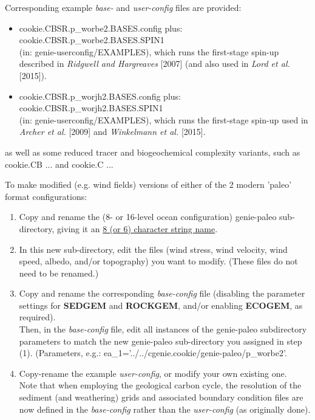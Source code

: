 \vspace{2mm}
\noindent Corresponding example \textit{base-} and \textit{user-config} files are provided:
\begin{itemize}[noitemsep]
\vspace{1mm}
\item \textsf{\footnotesize cookie.CBSR.p\_worbe2.BASES.config} plus: \textsf{\footnotesize cookie.CBSR.p\_worbe2.BASES.SPIN1} \\(in: \textsf{\footnotesize genie-userconfig/EXAMPLES}), which runs the first-stage spin-up described in \textit{Ridgwell and Hargreaves} [2007] (and also used in \textit{Lord et al.} [2015]).
\vspace{1mm}
\item \textsf{\footnotesize cookie.CBSR.p\_worjh2.BASES.config} plus: \textsf{\footnotesize cookie.CBSR.p\_worjh2.BASES.SPIN1} \\(in: \textsf{\footnotesize genie-userconfig/EXAMPLES}), which runs the first-stage spin-up used in \textit{Archer et al.} [2009] and \textit{Winkelmann et al.} [2015].
\end{itemize}

as well as some reduced tracer and biogeochemical complexity variants, such as \textsf{\footnotesize cookie.CB ...} and \textsf{\footnotesize cookie.C ...}

\vspace{2mm}
\noindent To make modified (e.g. wind fields) versions of either of the 2 modern 'paleo' format configurations:
\begin{enumerate}[noitemsep]
\vspace{1mm}
\item Copy and rename the  (8- or 16-level ocean configuration) \textsf{\footnotesize genie-paleo} sub-directory, giving it an \uline{8 (or 6) character string name}.
\vspace{1mm}
\item In this new sub-directory, edit the files (wind stress, wind velocity, wind speed, albedo, and/or topography) you want to modify. (These files do not need to be renamed.)
\vspace{1mm}
\item Copy and rename the corresponding \textit{base-config} file (disabling the parameter settings for \textbf{SEDGEM} and \textbf{ROCKGEM}, and/or enabling \textbf{ECOGEM}, as required).
\\Then, in the \textit{base-config} file, edit all instances of the \textsf{\footnotesize genie-paleo} subdirectory parameters  to match the new \textsf{\footnotesize genie-paleo} sub-directory you assigned in step (1). (Parameters, e.g.: \textsf{\footnotesize ea\_1='../../cgenie.cookie/genie-paleo/p\_worbe2'}.
\vspace{1mm}
\item Copy-rename the example \textit{user-config}, or modify your own existing one.
\\Note that when employing the geological carbon cycle, the resolution of the sediment (and weathering) grids and associated boundary condition files are now defined in the \textit{base-config} rather than the \textit{user-config} (as originally done).
\end{enumerate}

